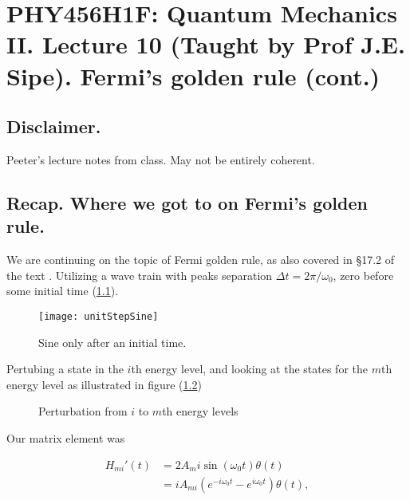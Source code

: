 
%

\chapter{PHY456H1F: Quantum Mechanics II.  Lecture 10 (Taught by Prof J.E. Sipe).  Fermi's golden rule (cont.)}
\label{chap:qmTwoL10}
{}
\date{Oct 10, 2011}

\beginArtWithToc

\section{Disclaimer.}

Peeter's lecture notes from class.  May not be entirely coherent.

\section{Recap. Where we got to on Fermi's golden rule.}

We are continuing on the topic of Fermi golden rule, as also covered in \S 17.2 of the text \cite{desai2009quantum}.  Utilizing a wave train with peaks separation $\Delta t = 2\pi/\omega_0$, zero before some initial time (\ref{fig:qmTwoL10:unitStepSine}).

\begin{figure}[htp]
   \centering
   \texttt{[image: unitStepSine]}
   \caption{Sine only after an initial time.}\label{fig:qmTwoL10:unitStepSine}
\end{figure}

Pertubing a state in the $i$th energy level, and looking at the states for the $m$th energy level as illustrated in figure (\ref{fig:qmTwoL10:2})

\begin{figure}[htp]
   \centering
   \def\svgwidth{0.3\columnwidth}
   
   \caption{Perturbation from $i$ to $m$th energy levels}\label{fig:qmTwoL10:2}
\end{figure}

Our matrix element was

\begin{equation}\label{eqn:qmTwoL10:10}
\begin{aligned}
H_{mi}'(t) 
&= 2 A_mi \sin(\omega_0 t) \theta(t) \\
&= i A_{mi} ( e^{-i \omega_0 t} - e^{i \omega_0 t} ) \theta(t),
\end{aligned}
\end{equation}

